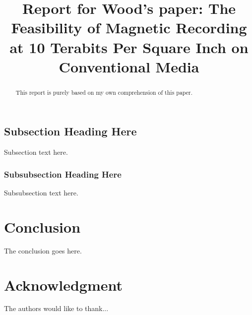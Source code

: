 \documentclass[conference]{IEEEtran}
\begin{document}
\title{Report for Wood's paper: 
The Feasibility of Magnetic Recording at 10 Terabits Per Square Inch on Conventional Media}

\author{
}

\maketitle

\begin{abstract}
This report is purely based on my own comprehension of this paper.
\end{abstract}

\IEEEpeerreviewmaketitle







\subsection{Subsection Heading Here}
Subsection text here.


\subsubsection{Subsubsection Heading Here}
Subsubsection text here.



\section{Conclusion}
The conclusion goes here.


\section*{Acknowledgment}


The authors would like to thank...



\end{document}
